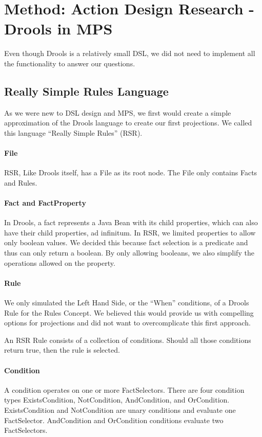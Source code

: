 \section{Method: Action Design Research - Drools in MPS}
\label{section:Method_action_research}

Even though Drools is a relatively small DSL, we did not need to implement all the functionality to answer our questions.

\subsection{Really Simple Rules Language}
As we were new to DSL design and MPS, we first would create a simple approximation of the Drools language to create our first projections.
We called this language ``Really Simple Rules'' (RSR).

\paragraph{File} RSR, Like Drools itself, has a File as its root node.
The File only contains Facts and Rules.

\paragraph{Fact and FactProperty} In Drools, a fact represents a Java Bean with its child properties, which can also have their child properties, ad infinitum.
In RSR, we limited properties to allow only boolean values.
We decided this because fact selection is a predicate and thus can only return a boolean.
By only allowing booleans, we also simplify the operations allowed on the property.

\paragraph{Rule} We only simulated the Left Hand Side, or the ``When'' conditions, of a Drools Rule for the Rules Concept.
We believed this would provide us with compelling options for projections and did not want to overcomplicate this first approach.

An RSR Rule consists of a collection of conditions.
Should all those conditions return true, then the rule is selected.

\paragraph{Condition} A condition operates on one or more FactSelectors.
There are four condition types ExistsCondition, NotCondition, AndCondition, and OrCondition.
ExistsCondition and NotCondition are unary conditions and evaluate one FactSelector.
AndCondition and OrCondition conditions evaluate two FactSelectors.


